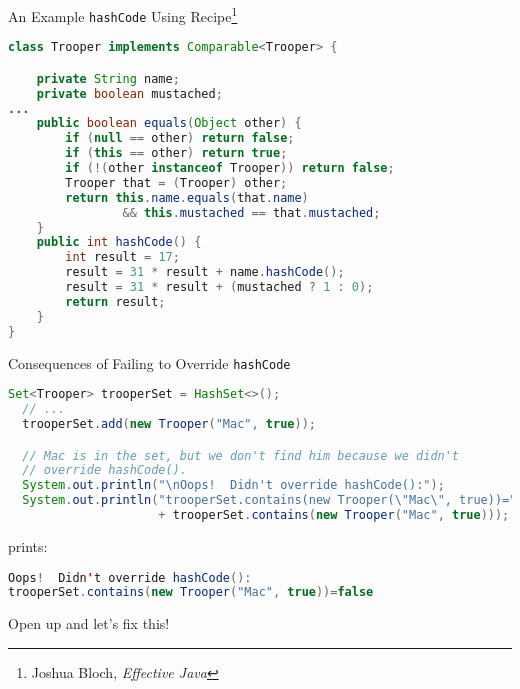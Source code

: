 \documentclass{beamer}
\begin{document}
\begin{frame}[fragile]{An Example {\tt hashCode} Using Recipe\footnote{Joshua Bloch, {\it Effective Java}}}

\begin{lstlisting}[language=Java]
class Trooper implements Comparable<Trooper> {

    private String name;
    private boolean mustached;
...
    public boolean equals(Object other) {
        if (null == other) return false;
        if (this == other) return true;
        if (!(other instanceof Trooper)) return false;
        Trooper that = (Trooper) other;
        return this.name.equals(that.name)
                && this.mustached == that.mustached;
    }
    public int hashCode() {
        int result = 17;
        result = 31 * result + name.hashCode();
        result = 31 * result + (mustached ? 1 : 0);
        return result;
    }
}
\end{lstlisting}

\end{frame}

\begin{frame}[fragile]{Consequences of Failing to Override {\tt hashCode}}

\begin{lstlisting}[language=Java]
  Set<Trooper> trooperSet = HashSet<>();
  // ...
  trooperSet.add(new Trooper("Mac", true));

  // Mac is in the set, but we don't find him because we didn't
  // override hashCode().
  System.out.println("\nOops!  Didn't override hashCode():");
  System.out.println("trooperSet.contains(new Trooper(\"Mac\", true))="
                     + trooperSet.contains(new Trooper("Mac", true)));

\end{lstlisting}
prints:
\begin{lstlisting}[language=Java]
Oops!  Didn't override hashCode():
trooperSet.contains(new Trooper("Mac", true))=false
\end{lstlisting}

Open up  and let's fix this!

\end{frame}
\end{document}

